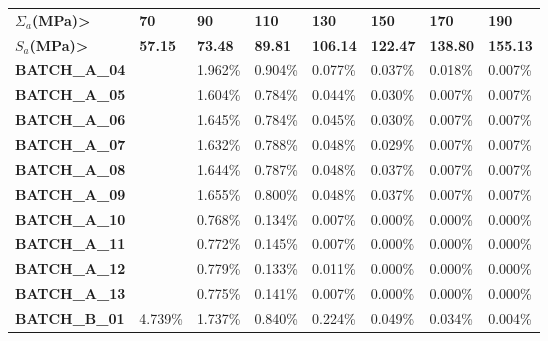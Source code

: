 \begin{table}[!h]
\centering
\begin{tabular}{llllllll}
\hline
\textbf{$\Sigma_{a}$(MPa)\textgreater}  & \textbf{70}    & \textbf{90}    & \textbf{110}   & \textbf{130}    & \textbf{150}    & \textbf{170}    & \textbf{190}    \\
\textbf{$S_{a}$(MPa)\textgreater} & \textbf{57.15} & \textbf{73.48} & \textbf{89.81} & \textbf{106.14} & \textbf{122.47} & \textbf{138.80} & \textbf{155.13} \\ \hline
\textbf{BATCH\_A\_04}           &                & 1.962\%        & 0.904\%        & 0.077\%         & 0.037\%         & 0.018\%         & 0.007\%         \\
\textbf{BATCH\_A\_05}           &                & 1.604\%        & 0.784\%        & 0.044\%         & 0.030\%         & 0.007\%         & 0.007\%         \\
\textbf{BATCH\_A\_06}           &                & 1.645\%        & 0.784\%        & 0.045\%         & 0.030\%         & 0.007\%         & 0.007\%         \\
\textbf{BATCH\_A\_07}           &                & 1.632\%        & 0.788\%        & 0.048\%         & 0.029\%         & 0.007\%         & 0.007\%         \\
\textbf{BATCH\_A\_08}           &                & 1.644\%        & 0.787\%        & 0.048\%         & 0.037\%         & 0.007\%         & 0.007\%         \\
\textbf{BATCH\_A\_09}           &                & 1.655\%        & 0.800\%        & 0.048\%         & 0.037\%         & 0.007\%         & 0.007\%         \\
\textbf{BATCH\_A\_10}           &                & 0.768\%        & 0.134\%        & 0.007\%         & 0.000\%         & 0.000\%         & 0.000\%         \\
\textbf{BATCH\_A\_11}           &                & 0.772\%        & 0.145\%        & 0.007\%         & 0.000\%         & 0.000\%         & 0.000\%         \\
\textbf{BATCH\_A\_12}           &                & 0.779\%        & 0.133\%        & 0.011\%         & 0.000\%         & 0.000\%         & 0.000\%         \\
\textbf{BATCH\_A\_13}           &                & 0.775\%        & 0.141\%        & 0.007\%         & 0.000\%         & 0.000\%         & 0.000\%         \\ \hline
\textbf{BATCH\_B\_01}           & 4.739\%        & 1.737\%        & 0.840\%        & 0.224\%         & 0.049\%         & 0.034\%         & 0.004\%         \\

\end{tabular}
\end{table}
